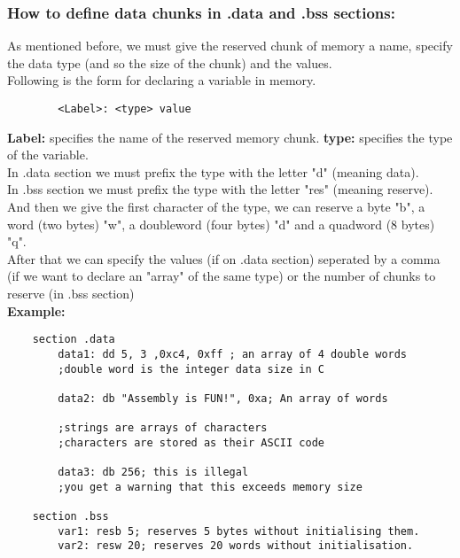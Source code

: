 \documentclass[10pt]{article}
\begin{document}
    \subsubsection{How to define data chunks in .data and .bss sections: }
    As mentioned before, we must give the reserved chunk of memory a name, specify the data type (and so the size of the chunk) and the values.\\
    Following is the form for declaring a variable in memory.
    \begin{verbatim}
        <Label>: <type> value
    \end{verbatim}
    \textbf{Label: }specifies the name of the reserved memory chunk.
    \textbf{type: }specifies the type of the variable.\\
    In .data section we must prefix the type with the letter "d" (meaning data).\\
    In .bss section we must prefix the type with the letter "res" (meaning reserve).\\
    And then we give the first character of the type, we can reserve a byte "b", a word (two bytes) "w", a doubleword (four bytes) "d" and a quadword (8 bytes) "q".\\
    After that we can specify the values (if on .data section) seperated by a comma (if we want to declare an "array" of the same type) or the number of chunks to reserve (in .bss section)
    \\\textbf{Example: }
    \begin{verbatim}
    section .data
        data1: dd 5, 3 ,0xc4, 0xff ; an array of 4 double words 
        ;double word is the integer data size in C
        
        data2: db "Assembly is FUN!", 0xa; An array of words 
        
        ;strings are arrays of characters
        ;characters are stored as their ASCII code

        data3: db 256; this is illegal
        ;you get a warning that this exceeds memory size

    section .bss
        var1: resb 5; reserves 5 bytes without initialising them.
        var2: resw 20; reserves 20 words without initialisation.
    \end{verbatim}

    
\end{document}
